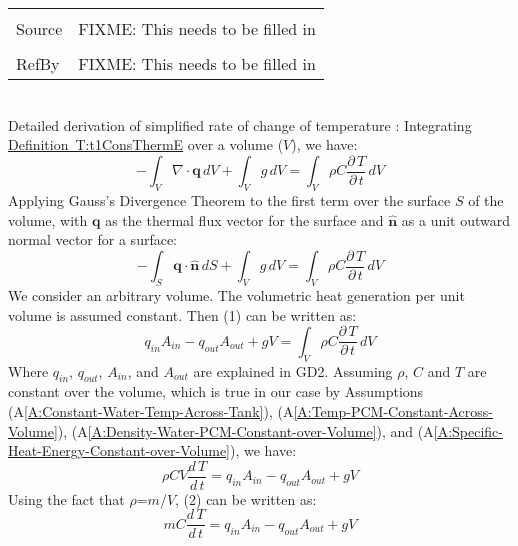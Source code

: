 \documentclass[12pt]{article}
\begin{document}
\begin{minipage}{\textwidth}
\begin{tabular}{p{} p{}}
\\ \midrule \\
Source & FIXME: This needs to be filled in
\\ \midrule \\
RefBy & FIXME: This needs to be filled in
\\ \bottomrule \end{tabular}
\end{minipage}\\
Detailed derivation of simplified rate of change of temperature :
Integrating \hyperref[T:t1ConsThermE]{Definition~T:t1ConsThermE} over a volume ($V$), we have:
\begin{dmath}
-\int_{V}{∇\cdot{}\mathbf{q}}\,dV+\int_{V}{g}\,dV=\int_{V}{ρ C \frac{\partial{}\,T}{\partial{}\,t}}\,dV
\end{dmath}
Applying Gauss's Divergence Theorem to the first term over the surface $S$ of the volume, with $\mathbf{q}$ as the thermal flux vector for the surface and $\mathbf{\hat{n}}$ as a unit outward normal vector for a surface:
\begin{dmath}
-\int_{S}{\mathbf{q}\cdot{}\mathbf{\hat{n}}}\,dS+\int_{V}{g}\,dV=\int_{V}{ρ C \frac{\partial{}\,T}{\partial{}\,t}}\,dV
\end{dmath}
We consider an arbitrary volume. The volumetric heat generation per unit volume is assumed constant. Then (1) can be written as:
\begin{dmath}
{q_{in}} {A_{in}}-{q_{out}} {A_{out}}+g V=\int_{V}{ρ C \frac{\partial{}\,T}{\partial{}\,t}}\,dV
\end{dmath}
Where ${q_{in}}$, ${q_{out}}$, ${A_{in}}$, and ${A_{out}}$ are explained in GD2. Assuming $ρ$, $C$ and $T$ are constant over the volume, which is true in our case by Assumptions (A\ref{A:Constant-Water-Temp-Across-Tank}), (A\ref{A:Temp-PCM-Constant-Across-Volume}), (A\ref{A:Density-Water-PCM-Constant-over-Volume}), and (A\ref{A:Specific-Heat-Energy-Constant-over-Volume}), we have:
\begin{dmath}
ρ C V \frac{d\,T}{d\,t}={q_{in}} {A_{in}}-{q_{out}} {A_{out}}+g V
\end{dmath}
Using the fact that $ρ$=$m$/$V$, (2) can be written as:
\begin{dmath}
m C \frac{d\,T}{d\,t}={q_{in}} {A_{in}}-{q_{out}} {A_{out}}+g V
\end{dmath}
\end{document}
